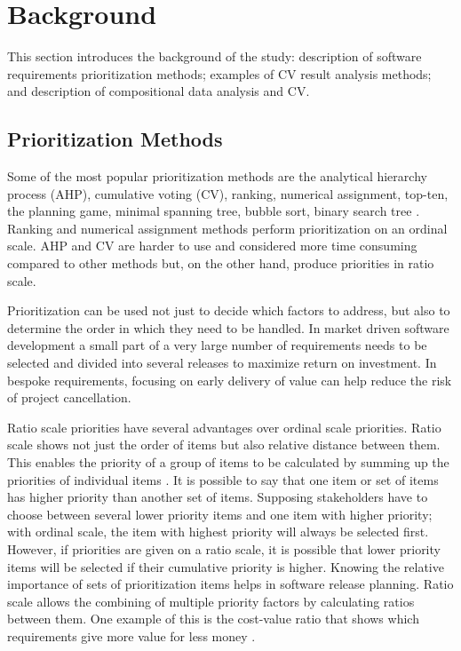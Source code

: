 \section{Background\label{background}}

This section introduces the background of the study: description of software requirements prioritization methods; examples of CV result analysis methods; and description of compositional data analysis and CV.

\subsection{Prioritization Methods}

Some of the most popular prioritization methods are the analytical hierarchy
process (AHP), cumulative voting (CV), ranking, numerical assignment,
top-ten, the planning game, minimal spanning tree, bubble sort, binary
search tree \citep{Berander2005,Karlsson1998}. Ranking and numerical
assignment methods perform prioritization on an ordinal scale. AHP and CV
are harder to use and considered more time consuming compared to other methods but, 
on the other hand, produce priorities in ratio scale.

Prioritization can be used not just to decide which factors to address,
but also to determine the order in which they need to be handled. In market
driven software development a small part of a very large number of requirements
needs to be selected and divided into several releases to maximize return
on investment. In bespoke requirements, focusing on early delivery
of value can help reduce the risk of project cancellation.

Ratio scale priorities have several advantages over ordinal scale
priorities. Ratio scale shows not just the order of items but also
relative distance between them. This enables the priority of a group of
items to be calculated by summing up the priorities of individual items
\citep{Berander2006a}. It is possible to say that one item or set
of items has higher priority than another set of items. Supposing stakeholders
have to choose between several lower priority items and one item with
higher priority; with ordinal scale, the item with highest priority will
always be selected first. However, if priorities are given on a ratio
scale, it is possible that lower priority items will be selected if
their cumulative priority is higher. Knowing the relative importance of
sets of prioritization items helps in software release planning. Ratio
scale allows the combining of multiple priority factors by calculating ratios
between them. One example of this is the cost-value ratio that shows which
requirements give more value for less money \citep{Karlsson1997}.

